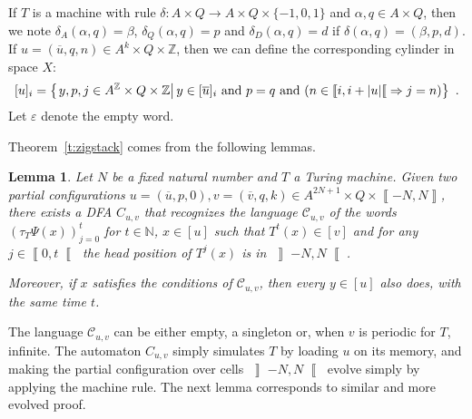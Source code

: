 \documentclass{llncs}
\newtheorem{lem}{Lemma}
\newcommand{\Zset}{{\mathbb Z}}
\newcommand{\Nset}{{\mathbb N}}
\newcommand{\length}[1]{\left|#1\right|}
\newcommand{\et}{\textrm{ and }}
\newcommand{\co}[2]{\left\llbracket #1,#2\right\llbracket}\newcommand{\cc}[2]{\left\llbracket #1,#2\right\rrbracket}\newcommand{\oo}[2]{\left\rrbracket #1,#2\right\llbracket}\newcommand{\oc}[2]{\left\rrbracket #1,#2\right\rrbracket}\newcommand{\ci}[1]{\co{#1}\infty}\newcommand{\io}[1]{\oo{-\infty}{#1}}\newcommand{\oi}[1]{\oo{#1}\infty}\newcommand{\ic}[1]{\oc{-\infty}{#1}}
\newcommand{\sett}[2]{\left\{\left.#1\vphantom{#2}\right|#2\right\}}
\newcommand{\set}[3]{\sett{#1\in#2}{#3}}
\begin{document}
If $T$ is a machine with rule $\delta:A\times Q\to A\times Q\times\{-1,0,1\}$ and $\alpha,q\in A\times Q$, then we note $\delta_A(\alpha,q)=\beta$, $\delta_Q(\alpha,q)=p$ and $\delta_D(\alpha,q)=d$ if $\delta(\alpha,q)=(\beta,p,d)$.
If $u=(\overline{u},q,n)\in A^k\times Q\times \Zset$, then we can define the corresponding cylinder in space $X$:
\[[u]_i=\set{y,p,j}{A^\Zset\times Q\times \Zset}{y\in[\overline{u}]_i\et p=q\et (n\in \co{i}{i+\length u}\Rightarrow j=n)}~.\]
Let $\varepsilon$ denote the empty word.

Theorem~\ref{t:zigstack} comes from the following lemmas.

\begin{lem}\label{l:centerDFA}
Let $N$ be a fixed natural number and $T$ a Turing machine.
Given two partial configurations $u=(\overline{u},p,0),v=(\overline v,q,k)\in A^{2N+1}\times Q\times \cc{-N}N$, there exists a DFA $C_{u,v}$ that recognizes the language $\mathcal C_{u,v}$ of the words $(\tau_T\Psi(x))_{j=0}^t$ for $t\in\Nset$, $x\in [u]$ such that $T^t(x)\in [v]$ and for any $j\in \co0t$ the head position of $T^j(x)$ is in $\oo{-N}N$.

Moreover, if $x$ satisfies the conditions of $\mathcal C_{u,v}$, then every $y\in [u]$ also does, with the same time $t$.
\end{lem}

The language $\mathcal C_{u,v}$ can be either empty, a singleton or, when $v$ is periodic for $T$, infinite.
The automaton $C_{u,v}$ simply simulates $T$ by loading $u$ on its memory, and making the partial configuration over cells $\oo{-N}N$ evolve simply by applying the machine rule.
The next lemma corresponds to similar and more evolved proof.
\end{document}
